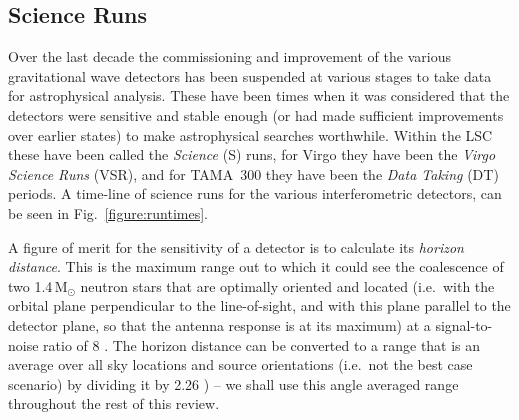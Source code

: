 \documentclass{article}
\begin{document}
\subsection{Science Runs}\label{subsection:runs}
Over the last decade the commissioning and improvement of the various gravitational 
wave detectors has been suspended at various stages to take data for
astrophysical analysis. These have been times when it was considered that the 
detectors were sensitive and stable enough (or had made sufficient improvements
over earlier states) to make astrophysical searches worthwhile. Within the LSC 
these have been called the {\it Science} (S) runs, for Virgo they have been the 
{\it Virgo Science Runs} (VSR), and for TAMA~300 they have been the {\it Data 
Taking} (DT) periods. A time-line of science runs for the various interferometric 
detectors, can be seen in Fig.~\ref{figure:runtimes}.


A figure of merit for the sensitivity of a detector is to calculate its {\it 
horizon distance}. This is the maximum 
range out to which it could see the coalescence of two 1.4\,M$_{\odot}$ neutron 
stars that are optimally oriented and located (i.e.~with the orbital plane 
perpendicular to the line-of-sight, and with this plane parallel to the detector
plane, so that the antenna response is at its maximum) at a signal-to-noise ratio 
of 8 \cite{Abbott:2005b}. The horizon distance can be converted to a range that is an 
average over all sky locations and source orientations (i.e.~not the best 
case scenario) by dividing it by 2.26 \cite{Sutton:2003}) -- we shall use this angle 
averaged range throughout the rest of this review.
\end{document}

